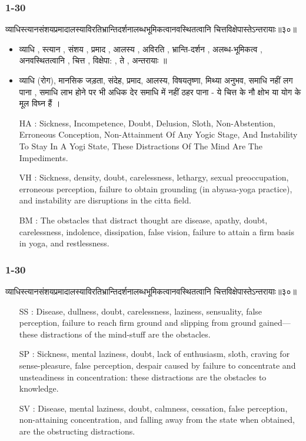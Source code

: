 \begin{frame}[fragile]\frametitle{1-30}
\begin{sanskrit}
व्याधिस्त्यानसंशयप्रमादालस्याविरतिभ्रान्तिदर्शनालब्धभूमिकत्वानवस्थितत्वानि चित्तविक्षेपास्तेऽन्तरायाः॥३०॥
\end{sanskrit}


		\begin{itemize}	
		\item व्याधि , स्त्यान , संशय , प्रमाद , आलस्य , अविरति , भ्रान्ति-दर्शन , अलब्ध-भूमिकत्व , अनवस्थितत्वानि , चित्त , विक्षेपा: , ते , अन्तरायाः ॥
		\item व्याधि (रोग), मानसिक जड़ता, संदेह, प्रमाद, आलस्य, विषयतृष्णा, मिथ्या अनुभव, समाधि नहीं लग पाना , समाधि लाभ होने पर भी अधिक देर समाधि में नहीं ठहर पाना - ये चित्त के नौ क्षोभ या योग के मूल विघ्न हैं ।		
		\item [HA]: Sickness, Incompetence, Doubt, Delusion, Sloth, Non-Abstention, Erroneous Conception, Non-Attainment Of Any Yogic Stage, And Instability To Stay In A Yogi State, These Distractions Of The Mind Are The Impediments.
		\item [VH]: Sickness, density, doubt, carelessness, lethargy, sexual preoccupation, erroneous perception, failure to obtain grounding (in abyasa-yoga practice), and instability are disruptions in the citta field.
		\item [BM]: The obstacles that distract thought are disease, apathy, doubt, carelessness, indolence, dissipation, false vision, failure to attain a firm basis in yoga, and restlessness.
		\end{itemize}

\end{frame}

\begin{frame}[fragile]\frametitle{1-30}
\begin{sanskrit}
व्याधिस्त्यानसंशयप्रमादालस्याविरतिभ्रान्तिदर्शनालब्धभूमिकत्वानवस्थितत्वानि चित्तविक्षेपास्तेऽन्तरायाः॥३०॥
\end{sanskrit}


		\begin{itemize}	
		\item [SS]: Disease, dullness, doubt, carelessness, laziness, sensuality, false perception, failure to reach firm ground and slipping from ground gained—these distractions of the mind-stuff are the obstacles.
		\item [SP]: Sickness, mental laziness, doubt, lack of enthusiasm, sloth, craving for sense-pleasure, false perception, despair caused by failure to concentrate and unsteadiness in concentration: these distractions are the obstacles to knowledge.
		\item [SV]: Disease, mental laziness, doubt, calmness, cessation, false perception, non-attaining concentration, and falling away from the state when obtained, are the obstructing distractions.
		\end{itemize}

\end{frame}






